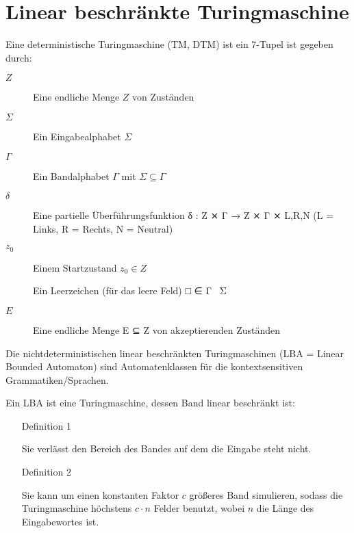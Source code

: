 \documentclass{lehramt-informatik-haupt}
\begin{document}


\chapter{Linear beschränkte Turingmaschine}

\begin{liQuellen}
\item \cite[Seite 312-317]{hoffmann}
\item \cite{wiki:turingmaschine}
\end{liQuellen}

Eine deterministische Turingmaschine (TM, DTM) ist ein 7-Tupel
\liTuringMaschine{} ist gegeben durch:

\begin{description}
\item[$Z$]
Eine endliche Menge $Z$ von Zuständen

\item[$\Sigma$]
Ein Eingabealphabet $\Sigma$

\item[$\Gamma$]
Ein Bandalphabet $\Gamma$ mit $\Sigma \subseteq \Gamma$

\item[$\delta$]
Eine partielle Überführungsfunktion
δ : Z ⨯ Γ → Z ⨯ Γ ⨯ {L,R,N} (L = Links, R = Rechts, N = Neutral)

\item[$z_0$]
Einem Startzustand $z_0 \in Z$

\item[\liTuringLeerzeichen]
Ein Leerzeichen (für das leere Feld) □ ∈ Γ \ Σ

\item[$E$]
Eine endliche Menge E ⊆ Z von
akzeptierenden Zuständen
\end{description}

Die nichtdeterministischen linear beschränkten Turingmaschinen
(LBA = Linear Bounded Automaton) sind Automatenklassen für die
kontextsensitiven Grammatiken/Sprachen.

Ein LBA ist eine Turingmaschine, dessen Band linear beschränkt ist:

\begin{itemize}
\item[Definition 1]

Sie verlässt den Bereich des Bandes auf dem die Eingabe steht nicht.

\item[Definition 2]

Sie kann um einen konstanten Faktor $c$ größeres Band simulieren, sodass
die Turingmaschine höchstens $c \cdot n$ Felder benutzt, wobei $n$ die
Länge des Eingabewortes ist.
\end{itemize}
\end{document}
